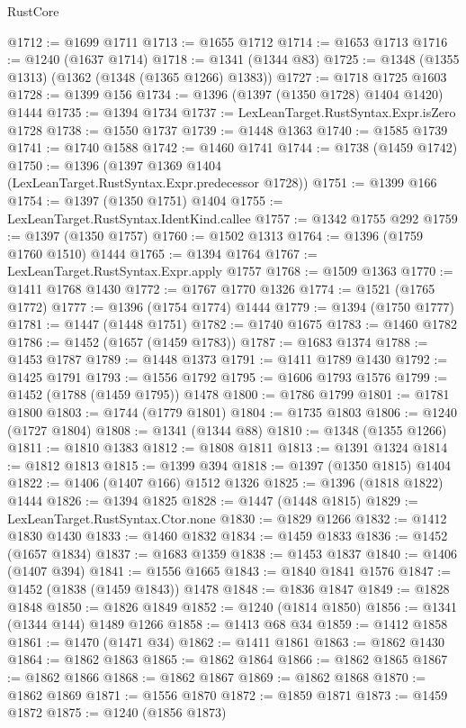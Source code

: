 \begin{lexlean}{RustCore}
\begin{coremodule}
@1712 := @1699 @1711
@1713 := @1655 @1712
@1714 := @1653 @1713
@1716 := @1240 (@1637 @1714)
@1718 := @1341 (@1344 @83)
@1725 := @1348 (@1355 @1313) (@1362 (@1348 (@1365 @1266) @1383))
@1727 := @1718 @1725 @1603
@1728 := @1399 @156
@1734 := @1396 (@1397 (@1350 @1728) @1404 @1420) @1444
@1735 := @1394 @1734
@1737 := LexLeanTarget.RustSyntax.Expr.isZero @1728
@1738 := @1550 @1737
@1739 := @1448 @1363
@1740 := @1585 @1739
@1741 := @1740 @1588
@1742 := @1460 @1741
@1744 := @1738 (@1459 @1742)
@1750 := @1396 (@1397 @1369 @1404 (LexLeanTarget.RustSyntax.Expr.predecessor @1728))
@1751 := @1399 @166
@1754 := @1397 (@1350 @1751) @1404
@1755 := LexLeanTarget.RustSyntax.IdentKind.callee
@1757 := @1342 @1755 @292
@1759 := @1397 (@1350 @1757)
@1760 := @1502 @1313
@1764 := @1396 (@1759 @1760 @1510) @1444
@1765 := @1394 @1764
@1767 := LexLeanTarget.RustSyntax.Expr.apply @1757
@1768 := @1509 @1363
@1770 := @1411 @1768 @1430
@1772 := @1767 @1770 @1326
@1774 := @1521 (@1765 @1772)
@1777 := @1396 (@1754 @1774) @1444
@1779 := @1394 (@1750 @1777)
@1781 := @1447 (@1448 @1751)
@1782 := @1740 @1675
@1783 := @1460 @1782
@1786 := @1452 (@1657 (@1459 @1783))
@1787 := @1683 @1374
@1788 := @1453 @1787
@1789 := @1448 @1373
@1791 := @1411 @1789 @1430
@1792 := @1425 @1791
@1793 := @1556 @1792
@1795 := @1606 @1793 @1576
@1799 := @1452 (@1788 (@1459 @1795)) @1478
@1800 := @1786 @1799
@1801 := @1781 @1800
@1803 := @1744 (@1779 @1801)
@1804 := @1735 @1803
@1806 := @1240 (@1727 @1804)
@1808 := @1341 (@1344 @88)
@1810 := @1348 (@1355 @1266)
@1811 := @1810 @1383
@1812 := @1808 @1811
@1813 := @1391 @1324
@1814 := @1812 @1813
@1815 := @1399 @394
@1818 := @1397 (@1350 @1815) @1404
@1822 := @1406 (@1407 @166) @1512 @1326
@1825 := @1396 (@1818 @1822) @1444
@1826 := @1394 @1825
@1828 := @1447 (@1448 @1815)
@1829 := LexLeanTarget.RustSyntax.Ctor.none
@1830 := @1829 @1266
@1832 := @1412 @1830 @1430
@1833 := @1460 @1832
@1834 := @1459 @1833
@1836 := @1452 (@1657 @1834)
@1837 := @1683 @1359
@1838 := @1453 @1837
@1840 := @1406 (@1407 @394)
@1841 := @1556 @1665
@1843 := @1840 @1841 @1576
@1847 := @1452 (@1838 (@1459 @1843)) @1478
@1848 := @1836 @1847
@1849 := @1828 @1848
@1850 := @1826 @1849
@1852 := @1240 (@1814 @1850)
@1856 := @1341 (@1344 @144) @1489 @1266
@1858 := @1413 @68 @34
@1859 := @1412 @1858
@1861 := @1470 (@1471 @34)
@1862 := @1411 @1861
@1863 := @1862 @1430
@1864 := @1862 @1863
@1865 := @1862 @1864
@1866 := @1862 @1865
@1867 := @1862 @1866
@1868 := @1862 @1867
@1869 := @1862 @1868
@1870 := @1862 @1869
@1871 := @1556 @1870
@1872 := @1859 @1871
@1873 := @1459 @1872
@1875 := @1240 (@1856 @1873)

\end{coremodule}
\end{lexlean}
